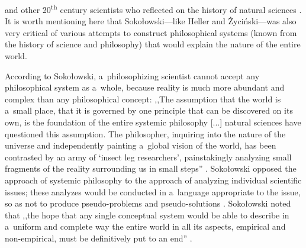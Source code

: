 \documentclass[%
  manuscript=article,
  year=2024,
  volume=77,
  doi=00000.000,
]{zfn}
\begin{document}
\parencite[][]{Heller1992BFilozofia} %
 and other 20\textsuperscript{th} century scientists who reflected on the history of natural sciences 
\parencites[][]{Wilson2011Konsiliencja}[][]{Schrodinger2017Przyroda}. %
 It is worth mentioning here that Sokołowski---like Heller and Życiński---was also very critical of various attempts to construct philosophical systems (known from the history of science and philosophy) that would explain the nature of the entire world.



According to Sokołowski, a~philosophizing scientist cannot accept any philosophical system as a~whole, because reality is much more abundant and complex than any philosophical concept: ,,The assumption that the world is a~small place, that it is governed by one principle that can be discovered on its own, is the foundation of the entire systemic philosophy [...] natural sciences have questioned this assumption. The philosopher, inquiring into the nature of the universe and independently painting a~global vision of the world, has been contrasted by an army of ‘insect leg researchers', painstakingly analyzing small fragments of the reality surrounding us in small steps''
\parencite[][p.45]{Sokoowski1989Gos}. %
 Sokołowski opposed the approach of systemic philosophy to the approach of analyzing individual scientific issues; these analyzes would be conducted in a~language appropriate to the issue, so as not to produce pseudo-problems and pseudo-solutions 
\parencite[][p.207]{Sokoowski1986Pluralizm}. %
 Sokołowski noted that ,,the hope that any single conceptual system would be able to describe in a~uniform and complete way the entire world in all its aspects, empirical and non-empirical, must be definitively put to an end'' 
\parencite[][]{Sokoowski1986Pluralizm}.%
\end{document}
